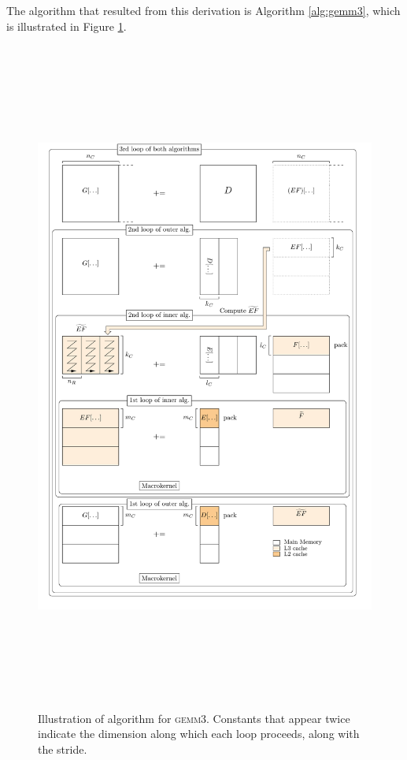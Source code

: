 \documentclass[12pt]{article}
\newcommand*{\gemmt}{{\textsc{gemm3}}}
\begin{document}
The algorithm that resulted from this derivation is Algorithm \ref{alg:gemm3}, which is illustrated in Figure \ref{fig:gemm3}.

\begin{figure}
  \centering
  \includegraphics[height=8.75in]{gemm3-picture}
  \caption{Illustration of algorithm for \gemmt{}. Constants that appear twice indicate the dimension along which each loop proceeds, along with the stride.}
  \label{fig:gemm3}
\end{figure}
\end{document}

